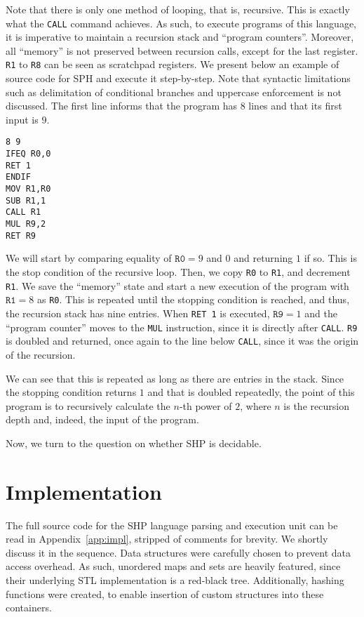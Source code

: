 \documentclass[12pt]{article}
\begin{document}
Note that there is only one method of looping, that is, recursive. This is exactly what the \texttt{CALL} command achieves. As such, to execute programs of this language, it is imperative to maintain a recursion stack and ``program counters''. Moreover, all ``memory'' is not preserved between recursion calls, except for the last register. \texttt{R1} to \texttt{R8} can be seen as scratchpad registers. We present below an example of source code for SPH and execute it step-by-step. Note that syntactic limitations such as delimitation of conditional branches and uppercase enforcement is not discussed. The first line informs that the program has $8$ lines and that its first input is $9$.

{\footnotesize
\begin{verbatim}
8 9
IFEQ R0,0
RET 1
ENDIF
MOV R1,R0
SUB R1,1
CALL R1
MUL R9,2
RET R9
\end{verbatim}}

We will start by comparing equality of $\texttt{R0} = 9$ and $0$ and returning $1$ if so. This is the stop condition of the recursive loop. Then, we copy \texttt{R0} to \texttt{R1}, and decrement \texttt{R1}. We save the ``memory'' state and start a new execution of the program with $\texttt{R1} = 8$ as \texttt{R0}. This is repeated until the stopping condition is reached, and thus, the recursion stack has nine entries. When \texttt{RET 1} is executed, $\texttt{R9} = 1$ and the ``program counter'' moves to the \texttt{MUL} instruction, since it is directly after \texttt{CALL}. \texttt{R9} is doubled and returned, once again to the line below \texttt{CALL}, since it was the origin of the recursion. 

We can see that this is repeated as long as there are entries in the stack. Since the stopping condition returns $1$ and that is doubled repeatedly, the point of this program is to recursively calculate the $n$-th power of $2$, where $n$ is the recursion depth and, indeed, the input of the program.

Now, we turn to the question on whether SHP is decidable. 

\section{Implementation}\label{sec:imp}

The full source code for the SHP language parsing and execution unit can be read in Appendix~\ref{app:impl}, stripped of comments for brevity. We shortly discuss it in the sequence. Data structures were carefully chosen to prevent data access overhead. As such, unordered maps and sets are heavily featured, since their underlying STL implementation is a red-black tree. Additionally, hashing functions were created, to enable insertion of custom structures into these containers. 
\end{document}
